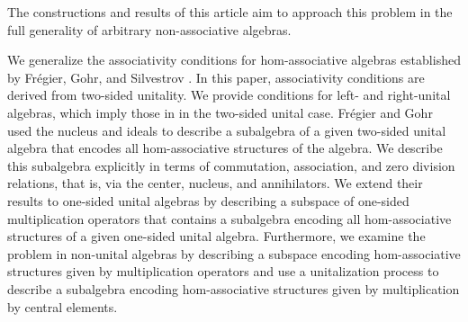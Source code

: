 \documentclass[12pt]{article}
\begin{document}
        The constructions and results of this article aim to approach this problem in the full generality of arbitrary non-associative algebras.

        We generalize the associativity conditions for hom-associative algebras established by Fr\'{e}gier, Gohr, and Silvestrov \cite{FreGohrSil:UnitalSurj}. In this paper, associativity conditions are derived from two-sided unitality. We provide conditions for left- and right-unital algebras, which imply those in \cite{FreGohrSil:UnitalSurj} in the two-sided unital case. Fr\'{e}gier and Gohr \cite{FreGohr:UnitCond} used the nucleus and ideals to describe a subalgebra of a given two-sided unital algebra that encodes all hom-associative structures of the algebra. We describe this subalgebra explicitly in terms of commutation, association, and zero division relations, that is, via the center, nucleus, and annihilators. We extend their results to one-sided unital algebras by describing a subspace of one-sided multiplication operators that contains a subalgebra encoding all hom-associative structures of a given one-sided unital algebra. Furthermore, we examine the problem in non-unital algebras by describing a subspace encoding hom-associative structures given by multiplication operators and use a unitalization process to describe a subalgebra encoding hom-associative structures given by multiplication by central elements.
\end{document}
